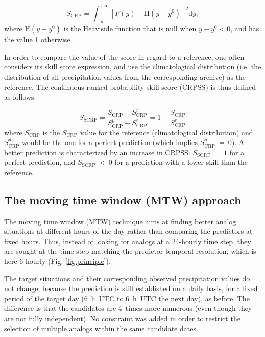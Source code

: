 \documentclass[hess, manuscript]{copernicus}
\begin{document}
\begin{equation}
\label{eq:CRPS}
S_{\text{CRP}} = \int_{-\infty}^{+\infty} \left[ F(y)-\text{H}(y-y^{0})\right]^{2} \text{d}y ,  
\end{equation}
where $\text{H}(y-y^{0})$ is the Heaviside function that is null when $y-y^{0}<0$, and has the value 1 otherwise.

In order to compare the value of the score in regard to a reference, one often considers its skill score expression, and use the climatological distribution (i.e. the distribution of all precipitation values from the corresponding archive) as the reference. The continuous ranked probability skill score (CRPSS) is thus defined as follows:

\begin{equation}
\label{eq:CRPSS}
S_{\text{SCRP}} = \frac{S_{\text{CRP}}-S_{\text{CRP}}^{r}}{S_{\text{CRP}}^{p}-S_{\text{CRP}}^{r}} = 1-\frac{S_{\text{CRP}}}{S_{\text{CRP}}^{r}}
\end{equation}
where $S_{\text{CRP}}^{r}$ is the $S_{\text{CRP}}$ value for the reference (climatological distribution) and $S_{\text{CRP}}^{p}$ would be the one for a perfect prediction (which implies $S_{\text{CRP}}^{p}~=~0$). A better prediction is characterized by an increase in CRPSS: $S_{\text{SCRP}}~=~1$ for a perfect prediction, and $S_{\text{SCRP}}~<~0$ for a prediction with a lower skill than the reference.


\subsection{The moving time window (MTW) approach}
\label{sec:mtw}

The moving time window (MTW) technique aims at finding better analog situations at different hours of the day rather than comparing the predictors at fixed hours. Thus, instead of looking for analogs at a 24-hourly time step, they are sought at the time step matching the predictor temporal resolution, which is here 6-hourly (Fig. \ref{fig:principle}).

The target situations and their corresponding observed precipitation values do not change, because the prediction is still established on a daily basis, for a fixed period of the target day (6~h~UTC to 6~h~UTC the next day), as before. The difference is that the candidates are 4~times more numerous (even though they are not fully independent). No constraint was added in order to restrict the selection of multiple analogs within the same candidate dates.
\end{document}
